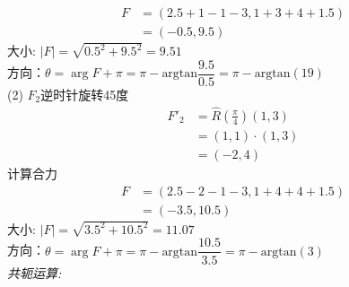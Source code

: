 \[ \begin{aligned}
   F &= (2.5 +1-1-3, 1+3+4+1.5) \\ 
   &= (-0.5, 9.5)
\end{aligned} \]
大小: $\left\vert F\right\vert = \sqrt{0.5^2 + 9.5^2} =9.51 $ \\
方向：$\theta = \arg F + \pi = \pi - \text{argtan} \dfrac{9.5}{0.5}  = \pi - \text{argtan} (19)$ \\
(2) $F_2$逆时针旋转45度
\[ \begin{aligned}
  F'_2 &= \hat{R}(\frac{\pi}{4})(1,3) \\
  &= (1, 1) \cdot (1,3) \\ 
  &= (-2, 4)
\end{aligned}\]
计算合力 
\[ \begin{aligned}
   F &= (2.5 -2-1-3, 1+4+4+1.5) \\ 
   &= (-3.5, 10.5)
\end{aligned} \]
大小: $\left\vert F\right\vert = \sqrt{3.5^2 + 10.5^2} =11.07 $ \\
方向：$\theta = \arg F + \pi = \pi - \text{argtan} \dfrac{10.5}{3.5}  = \pi - \text{argtan} (3)$ \\

\noindent \emph{共轭运算: } 

